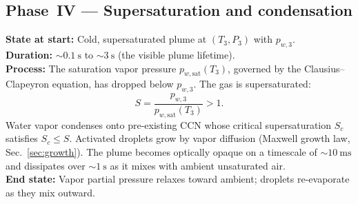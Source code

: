 \documentclass[11pt,a4paper]{article}
\newcommand{\pwsat}{p_{w,\text{sat}}}
\theoremstyle{definition}
\theoremstyle{plain}
\begin{document}
\subsection{Phase~IV — Supersaturation and condensation}
\label{sec:phase4}

\textbf{State at start:} Cold, supersaturated plume at $(T_3, P_3)$ with $p_{w,3}$.\\
\textbf{Duration:} $\sim\!\SI{0.1}{\second}$ to $\sim\!\SI{3}{\second}$ (the visible plume lifetime).\\
\textbf{Process:} The saturation vapor pressure $\pwsat(T_3)$, governed by the Clausius–Clapeyron equation, has dropped below $p_{w,3}$. The gas is supersaturated:
\begin{equation}
\label{eq:Sdef}
S = \frac{p_{w,3}}{\pwsat(T_3)} > 1.
\end{equation}
Water vapor condenses onto pre-existing CCN whose critical supersaturation $S_c$ satisfies $S_c \le S$. Activated droplets grow by vapor diffusion (Maxwell growth law, Sec.~\ref{sec:growth}). The plume becomes optically opaque on a timescale of $\sim\!\SI{10}{\milli\second}$ and dissipates over $\sim\!\SI{1}{\second}$ as it mixes with ambient unsaturated air.\\
\textbf{End state:} Vapor partial pressure relaxes toward ambient; droplets re-evaporate as they mix outward.
\end{document}
